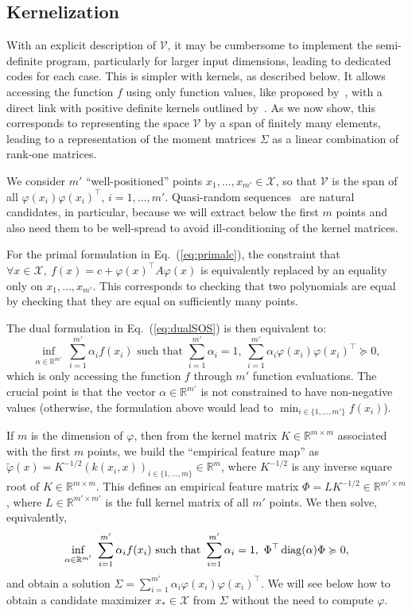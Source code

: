 \documentclass[11pt]{article}
\newcommand{\BEQ}{\begin{equation}}
\newcommand{\EEQ}{\end{equation}}
\newcommand{\diag}{\mathop{\rm diag}}
\newcommand{\rb}{\mathbb{R}}
\newcommand{\eq}[1]{Eq.~(\ref{eq:#1})}
\def \X{{\mathcal X}}
\def \V{{\mathcal V}}
\begin{document}
   \subsection{Kernelization}
   \label{sec:kernelization}
  With an explicit description of $\V$, it may be cumbersome to implement the semi-definite program, particularly for larger input dimensions, leading to dedicated codes for each case. This is simpler with kernels, as described below. It allows accessing the function $f$ using only function values, like proposed by~\cite{lofberg2004coefficients}, with a direct link with positive definite kernels outlined by~\cite{rudi2020finding}. As we now show, this corresponds to representing the space $\V$ by a span of finitely many elements, leading to a representation of the moment matrices $\Sigma$ as a linear combination of rank-one matrices. 
   
   
   
   We consider $m'$ ``well-positioned'' points $x_1,\dots,x_{m'} \in \X$, so that $\V$ is the span of all $\varphi(x_i)\varphi(x_i)^\top$, $i=1,\dots,m'$. Quasi-random sequences~\cite{morokoff1994quasi} are natural candidates, in particular, because we will extract below the first $m$ points and also need them to be well-spread to avoid ill-conditioning of the kernel matrices.
   
   For the primal formulation in \eq{primalc}, the constraint that  $\forall x \in \X, \ f(x) = c + \varphi(x)^\top A \varphi(x) $ is equivalently replaced by an equality only on $x_1,\dots,x_{m'}$. This corresponds to checking that two polynomials are equal by checking that they are equal on sufficiently many points.
   
 The dual formulation in 
 \eq{dualSOS} is then equivalent to:
   \[
   \inf_{ \alpha \in \rb^{m'}} \ \sum_{i=1}^{m'} \alpha_i f(x_i) \mbox{ such that } \sum_{i=1}^{m'} \alpha_i = 1 , \ \sum_{i=1}^{m'} \alpha_i \varphi(x_i) \varphi(x_i)^\top \succcurlyeq 0,
   \]
   which is only accessing the function $f$ through $m'$ function evaluations. The crucial point is that the vector $\alpha \in \rb^{m'}$ is not constrained to have non-negative values (otherwise, the formulation above would lead to $\min_{i \in \{1,\dots,m'\}} f(x_i)$).
   
   If $m$ is the dimension of $\varphi$, then from the kernel matrix $K \in \rb^{m \times m}$ associated with the first $m$ points, we build the ``empirical feature map'' as 
   $
   \tilde{\varphi}(x) = K ^{-1/2} ( k(x_i,x))_{i \in \{1,\dots,m\}}  \in \rb^m $,
   where $K ^{-1/2}$ is any inverse square root of $K \in \rb^{m \times m}$. 
   This defines an empirical feature matrix
   $\Phi  = L K^{-1/2} \in \rb^{m' \times m}$, where $L \in \rb^{m' \times m'}$ is the full kernel matrix of all $m'$ points. We then solve, equivalently,
    \BEQ
\label{eq:sdpsos}   \inf_{ \alpha \in \rb^{m'}} \ \sum_{i=1}^{m'} \alpha_i f(x_i) \mbox{ such that } \sum_{i=1}^{m'} \alpha_i = 1 , \ 
   \Phi^\top \diag(\alpha) \Phi\succcurlyeq 0,
   \EEQ
   and obtain a solution $  \Sigma = \sum_{i=1}^{m'} \alpha_i \varphi(x_i) \varphi(x_i)^\top$. We will see below how to obtain a candidate maximizer $x_\ast \in \X$ from $\Sigma$ without the need to compute $\varphi$.
  
\end{document}
